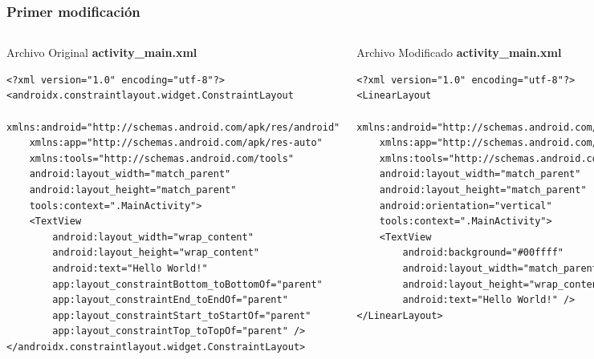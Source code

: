 \begin{frame}[fragile]
\frametitle{Primer modificaci\'on}

\begin{columns}
\begin{block}{Archivo Original \textbf{activity\_main.xml}}
\begin{verbatim}
<?xml version="1.0" encoding="utf-8"?>
<androidx.constraintlayout.widget.ConstraintLayout 
    xmlns:android="http://schemas.android.com/apk/res/android"
    xmlns:app="http://schemas.android.com/apk/res-auto"
    xmlns:tools="http://schemas.android.com/tools"
    android:layout_width="match_parent"
    android:layout_height="match_parent"
    tools:context=".MainActivity">
    <TextView
        android:layout_width="wrap_content"
        android:layout_height="wrap_content"
        android:text="Hello World!"
        app:layout_constraintBottom_toBottomOf="parent"
        app:layout_constraintEnd_toEndOf="parent"
        app:layout_constraintStart_toStartOf="parent"
        app:layout_constraintTop_toTopOf="parent" />
</androidx.constraintlayout.widget.ConstraintLayout>
\end{verbatim}
\end{block}
\begin{block}{Archivo Modificado \textbf{activity\_main.xml}}
\begin{verbatim}
<?xml version="1.0" encoding="utf-8"?>
<LinearLayout
    xmlns:android="http://schemas.android.com/apk/res/android"
    xmlns:app="http://schemas.android.com/apk/res-auto"
    xmlns:tools="http://schemas.android.com/tools"
    android:layout_width="match_parent"
    android:layout_height="match_parent"
    android:orientation="vertical"
    tools:context=".MainActivity">
    <TextView
        android:background="#00ffff"
        android:layout_width="match_parent"
        android:layout_height="wrap_content"
        android:text="Hello World!" />
</LinearLayout>
\end{verbatim}
\end{block}
\end{columns}
\end{frame}





